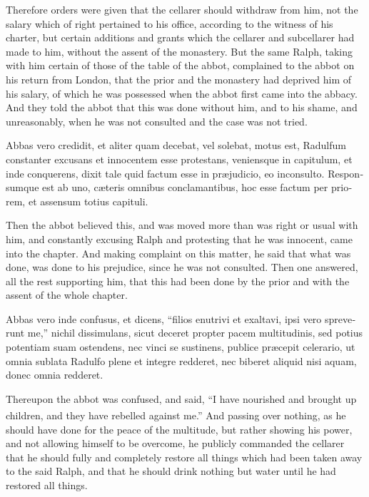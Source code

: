 \documentclass{book}
\newcounter{engnote}
\newcommand{\engnotenum}{\textsuperscript{\arabic{engnote}\stepcounter{engnote}}}
\newcommand{\engnotetext}[1]{\vphantom{\footnotemark{}}\footnotetext{#1}}
\begin{document}
\begin{paracol}{2}
\switchcolumn

Therefore orders were given that the cellarer should withdraw from him, not the salary which of right pertained to his office, according to the witness of his charter, but certain additions and grants which the cellarer and subcellarer had made to him, without the assent of the monastery. But the same Ralph, taking with him certain of those of the table of the abbot, complained to the abbot on his return from London, that the prior and the monastery had deprived him of his salary, of which he was possessed when the abbot first came into the abbacy. And they told the abbot that this was done without him, and to his shame, and unreasonably, when he was not consulted and the case was not tried.

\switchcolumn*

\begin{otherlanguage}{latin}
Abbas vero credidit, et aliter quam decebat, vel solebat, motus est, Radulfum constanter excusans et innocentem esse protestans, veniensque in capitulum, et inde conquerens, dixit tale quid factum esse in pr\ae{}judicio, eo inconsulto. Responsumque est ab uno, c\ae{}teris omnibus conclamantibus, hoc esse factum per priorem, et assensum totius capituli.
\end{otherlanguage}

\switchcolumn

Then the abbot believed this, and was moved more than was right or usual with him, and constantly excusing Ralph and protesting that he was innocent, came into the chapter. And making complaint on this matter, he said that what was done, was done to his prejudice, since he was not consulted. Then one answered, all the rest supporting him, that this had been done by the prior and with the assent of the whole chapter.

\switchcolumn*

\begin{otherlanguage}{latin}
Abbas vero inde confusus, et dicens, ``filios enutrivi et exaltavi, ipsi vero spreverunt me,''\engnotetext{Isai.\ i., \oldstylenums{2}.} nichil dissimulans, sicut deceret propter pacem multitudinis, sed potius potentiam suam ostendens, nec vinci se sustinens, publice pr\ae{}cepit celerario, ut omnia sublata Radulfo plene et integre redderet, nec biberet aliquid nisi aquam, donec omnia redderet.
\end{otherlanguage}

\switchcolumn

Thereupon the abbot was confused, and said, ``I have nourished and brought up children, and they have rebelled against me.''\engnotenum{} And passing over nothing, as he should have done for the peace of the multitude, but rather showing his power, and not allowing himself to be overcome, he publicly commanded the cellarer that he should fully and completely restore all things which had been taken away to the said Ralph, and that he should drink nothing but water until he had restored all things.


\end{paracol}
\end{document}
